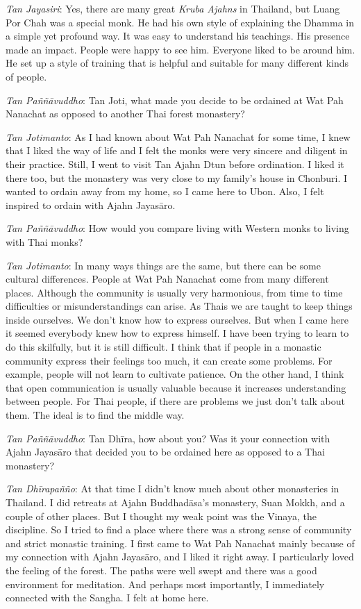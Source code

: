 \emph{Tan Jayasiri}: Yes, there are many great \emph{Kruba Ajahns}
in Thailand, but Luang Por Chah was a special monk. He had
his own style of explaining the Dhamma in a simple yet profound way. It
was easy to understand his teachings. His presence made an impact. 
People were happy to see him. Everyone liked to be around him. He set up
a style of training that is helpful and suitable for many different
kinds of people. 

\clearpage

\emph{Tan Paññāvuddho}: Tan Joti, what made you decide to be ordained
at Wat Pah Nanachat as opposed to another Thai forest monastery? 

\emph{Tan Jotimanto}: As I had known about Wat Pah Nanachat for some
time, I knew that I liked the way of life and I felt the monks were very
sincere and diligent in their practice. Still, I went to visit Tan Ajahn
Dtun before ordination. I liked it there too, but the monastery was very
close to my family's house in Chonburi. I wanted to ordain away from my
home, so I came here to Ubon. Also, I felt inspired to ordain with Ajahn
Jayasāro. 

\emph{Tan Paññāvuddho}: How would you compare living with Western monks
to living with Thai monks? 

\emph{Tan Jotimanto}: In many ways things are the same, but there can be
some cultural differences. People at Wat Pah Nanachat come from many
different places. Although the community is usually very harmonious, 
from time to time difficulties or misunderstandings can arise. As Thais
we are taught to keep things inside ourselves. We don't know how to
express ourselves. But when I came here it seemed everybody knew how to
express himself. I have been trying to learn to do this skilfully, but
it is still difficult. I think that if people in a monastic community
express their feelings too much, it can create some problems. For
example, people will not learn to cultivate patience. On the other hand, 
I think that open communication is usually valuable because it increases
understanding between people. For Thai people, if there are problems we
just don't talk about them. The ideal is to find the middle way. 

\emph{Tan Paññāvuddho}: Tan Dhīra, how about you? Was it your
connection with Ajahn Jayasāro that decided you to be ordained here as
opposed to a Thai monastery? 

\emph{Tan Dhīrapañño}: At that time I didn't know much about other
monasteries in Thailand. I did retreats at Ajahn Buddhadāsa's monastery, 
Suan Mokkh, and a couple of other places. But I thought my weak point
was the Vinaya, the discipline. So I tried to find a place where there
was a strong sense of community and strict monastic training. I first
came to Wat Pah Nanachat mainly because of my connection with Ajahn
Jayasāro, and I liked it right away. I particularly loved the feeling of
the forest. The paths were well swept and there was a good environment
for meditation. And perhaps most importantly, I immediately connected
with the Sangha. I felt at home here. 

